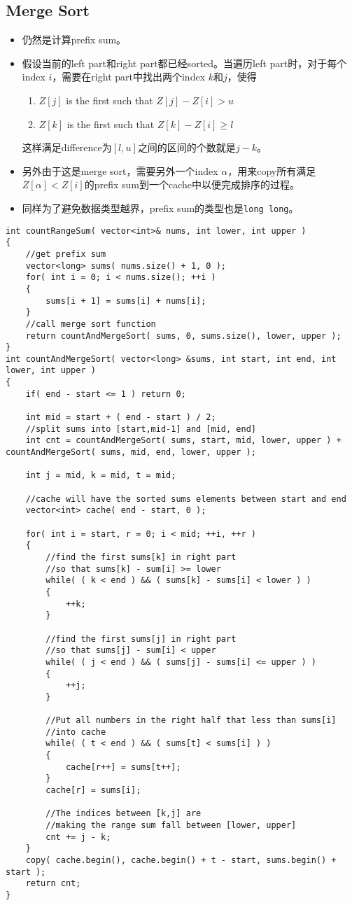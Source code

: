 \subsection{Merge Sort}
\begin{itemize}
\item 仍然是计算prefix sum。
\item 假设当前的left part和right part都已经sorted。当遍历left part时，对于每个index $i$，需要在right part中找出两个index $k$和$j$，使得
\begin{enumerate}
\item $ Z[j] $ is the first such that $Z[j] - Z[i] > u$
\item $ Z[k] $ is the first such that $ Z[k] - Z[i] \geq l $
\end{enumerate}
这样满足difference为$ [l,u] $之间的区间的个数就是$j-k$。
\item 另外由于这是merge sort，需要另外一个index $\alpha$，用来copy所有满足$Z[\alpha]<Z[i]$的prefix sum到一个cache中以便完成排序的过程。
\item 同样为了避免数据类型越界，prefix sum的类型也是\texttt{long long}。
\end{itemize}
\begin{lstlisting}[style=customc, caption={Merge Sort}]
int countRangeSum( vector<int>& nums, int lower, int upper )
{
    //get prefix sum
    vector<long> sums( nums.size() + 1, 0 );
    for( int i = 0; i < nums.size(); ++i )
    {
        sums[i + 1] = sums[i] + nums[i];
    }
    //call merge sort function
    return countAndMergeSort( sums, 0, sums.size(), lower, upper );
}
int countAndMergeSort( vector<long> &sums, int start, int end, int lower, int upper )
{
    if( end - start <= 1 ) return 0;

    int mid = start + ( end - start ) / 2;
    //split sums into [start,mid-1] and [mid, end]
    int cnt = countAndMergeSort( sums, start, mid, lower, upper ) + countAndMergeSort( sums, mid, end, lower, upper );

    int j = mid, k = mid, t = mid;

    //cache will have the sorted sums elements between start and end
    vector<int> cache( end - start, 0 );

    for( int i = start, r = 0; i < mid; ++i, ++r )
    {
        //find the first sums[k] in right part
        //so that sums[k] - sum[i] >= lower
        while( ( k < end ) && ( sums[k] - sums[i] < lower ) )
        {
            ++k;
        }

        //find the first sums[j] in right part
        //so that sums[j] - sum[i] < upper
        while( ( j < end ) && ( sums[j] - sums[i] <= upper ) )
        {
            ++j;
        }

        //Put all numbers in the right half that less than sums[i]
        //into cache
        while( ( t < end ) && ( sums[t] < sums[i] ) )
        {
            cache[r++] = sums[t++];
        }
        cache[r] = sums[i];

        //The indices between [k,j] are
        //making the range sum fall between [lower, upper]
        cnt += j - k;
    }
    copy( cache.begin(), cache.begin() + t - start, sums.begin() + start );
    return cnt;
}
\end{lstlisting}
